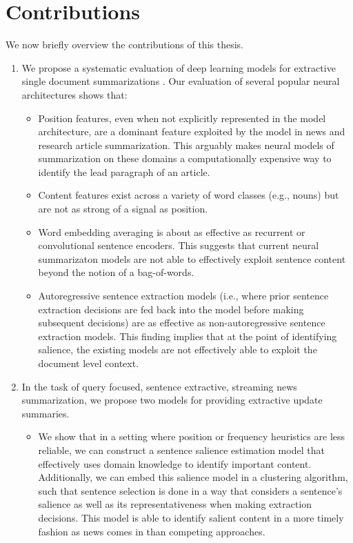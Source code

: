 \section{Contributions}
  
  We now briefly overview the contributions of this thesis.
  
  
  \begin{enumerate}
          \item We propose a systematic evaluation of deep learning models
              for extractive single document summarizations \citep{kedzie2018}. 
              Our evaluation of several popular neural architectures shows 
              that:
              \begin{itemize}
                  \item Position features, even when not explicitly represented
                      in the model architecture, are a dominant feature
                      exploited by the model in news and research article
summarization. This arguably makes neural models of summarization on these domains a computationally expensive way to identify the lead paragraph of an article.
                  \item Content features exist across a variety of word classes (e.g., nouns)
                      but are not as strong of a signal as position.
                  \item Word embedding averaging is about as effective as 
                      recurrent or convolutional sentence encoders. This suggests that current neural summarizaton models are not able to effectively exploit
sentence content beyond the notion of a bag-of-words.
                \item Autoregressive sentence extraction models (i.e., where prior sentence extraction decisions are fed back into the model before making subsequent decisions) are as effective as non-autoregressive sentence extraction
models. This finding implies that at the point of identifying salience, the existing models are not effectively able to exploit the document level context. 
              \end{itemize}
          \item In the task of query focused, sentence extractive, streaming news 
              summarization, we propose two models for providing 
              extractive update summaries. \citep{kedzie2015,kedzie2016}
              \begin{itemize}
                    \item We show that in a setting where position or 
frequency heuristics are less reliable, we can construct a sentence 
salience estimation model that effectively uses domain knowledge to identify
important content. Additionally, we can embed this salience model in a 
clustering algorithm, such that sentence selection is done in a way that
considers a sentence's salience as well as its representativeness when making extraction decisions. This model
is able to identify salient content in a more timely fashion as news comes in than competing approaches.



\end{itemize}
\end{enumerate}
